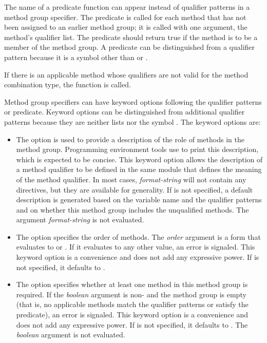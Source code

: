 \begin{defmac}
The name of a predicate function can appear instead of qualifier
patterns in a method group specifier.  The predicate is called for
each method that has not been assigned to an earlier method group; it
is called with one argument, the method's qualifier list.  The
predicate should return true if the method is to be a member of the
method group.  A predicate can be distinguished from a qualifier pattern
because it is a symbol other than  or \cdf{*}.

If there is an applicable method whose qualifiers are not valid
for the method combination type, the function 
is called.

Method group specifiers can have keyword options following the
qualifier patterns or predicate.  Keyword options can be distinguished from
additional qualifier patterns because they are neither lists nor the symbol
\cdf{*}.  The keyword options are:

\begin{itemize}

\item 
The  option is used to provide a description of the
role of methods in the method group.  Programming environment tools
use  to print this description, which
is expected to be concise.  This keyword
option allows the description of a method qualifier to be defined in
the same module that defines the meaning of the method
qualifier.  In most cases, \emph{format-string} will not contain any
 directives, but they are available for generality.  If 
 is not specified, a default description is generated
based on the variable name and the qualifier patterns and on whether
this method group includes the unqualified methods.  The argument
\emph{format-string} is not evaluated. 

\item 
The  option specifies the order of methods.  The \emph{order}
argument is a form that evaluates to  
 or .  If it evaluates
to any other value, an error is signaled.  This keyword option is a
convenience and does not add any expressive power.
If  is not specified, it defaults to .

\item 
The  option specifies whether at least one method in
this method group is required.  If the \emph{boolean} argument is
non- and the method group is empty (that is, no applicable
methods match the qualifier patterns or satisfy the predicate), an
error is signaled.  This keyword option is a convenience and does not
add any expressive power.  If  is not specified,
it defaults to .  The \emph{boolean} argument is not
evaluated.
\end{itemize}


\end{defmac}
